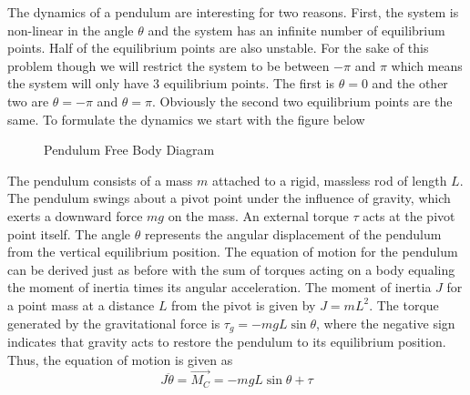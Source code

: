The dynamics of a pendulum are interesting for two reasons. First, the system is non-linear in the angle $\theta$ and the system has an infinite number of equilibrium points. Half of the equilibrium points are also unstable. For the sake of this problem though we will restrict the system to be between $-\pi$ and $\pi$ which means the system will only have 3 equilibrium points. The first is $\theta=0$ and the other two are $\theta=-\pi$ and $\theta=\pi$. Obviously the second two equilibrium points are the same. To formulate the dynamics we start with the figure below
\begin{figure}[H]
    \centering
    \caption{Pendulum Free Body Diagram}
\end{figure}
The pendulum consists of a mass $m$ attached to a rigid, massless rod of length $L$. The pendulum swings about a pivot point under the influence of gravity, which exerts a downward force $mg$ on the mass. An external torque $\tau$ acts at the pivot point itself. The angle $\theta$ represents the angular displacement of the pendulum from the vertical equilibrium position. The equation of motion for the pendulum can be derived just as before with the sum of torques acting on a body equaling the moment of inertia times its angular acceleration. The moment of inertia $J$ for a point mass at a distance $L$ from the pivot is given by $J = mL^2$. The torque generated by the gravitational force is $\tau_g = -mgL \sin{\theta}$, where the negative sign indicates that gravity acts to restore the pendulum to its equilibrium position. Thus, the equation of motion is given as
\begin{equation}
    J\ddot{\theta} = \vec{M_C} = -mgL \sin{\theta} + \tau
\end{equation}
